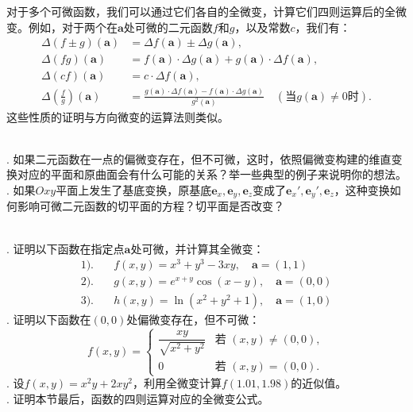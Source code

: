 \documentclass[12pt,UTF8,fontset=none]{ctexbook}
\begin{document}
对于多个可微函数，我们可以通过它们各自的全微变，计算它们四则运算后的全微变。例如，对于两个在$\mathbf{a}$处可微的二元函数$f$和$g$，以及常数$c$，我们有：
\begin{align*}
    \Delta (f\pm g)(\mathbf{a}) &= \Delta f(\mathbf{a}) \pm \Delta g(\mathbf{a}), \\
    \Delta (fg)(\mathbf{a}) &= f(\mathbf{a})\cdot \Delta g(\mathbf{a}) + g(\mathbf{a})\cdot \Delta f(\mathbf{a}), \\
    \Delta(cf)(\mathbf{a}) &= c\cdot \Delta f(\mathbf{a}), \\
    \Delta\left(\frac{f}{g}\right)(\mathbf{a}) &= \frac{g(\mathbf{a})\cdot \Delta f(\mathbf{a}) - f(\mathbf{a})\cdot \Delta g(\mathbf{a})}{g^2(\mathbf{a})} \quad \left(\mbox{当}g(\mathbf{a})\neq 0\mbox{时}\right).
\end{align*}
这些性质的证明与方向微变的运算法则类似。

\begin{sk}
\mbox{}\\
. 如果二元函数在一点的偏微变存在，但不可微，这时，依照偏微变构建的维直变换对应的平面和原曲面会有什么可能的关系？举一些典型的例子来说明你的想法。\\
. 如果$Oxy$平面上发生了基底变换，原基底$\mathbf{e}_x, \mathbf{e}_y, \mathbf{e}_z$变成了$\mathbf{e}_x', \mathbf{e}_y', \mathbf{e}_z$，这种变换如何影响可微二元函数的切平面的方程？切平面是否改变？
\end{sk}

\begin{xt}
    \mbox{}\\
    . 证明以下函数在指定点$\mathbf{a}$处可微，并计算其全微变：
    \begin{align*}
    1).& \quad f(x,y) = x^3 + y^3 - 3xy, \quad \mathbf{a} = (1,1) \\
    2).& \quad g(x,y) = e^{x+y}\cos(x-y), \quad \mathbf{a} = (0,0) \\
    3).& \quad h(x,y) = \ln(x^2+y^2+1), \quad \mathbf{a} = (1,0)
    \end{align*}
    . 证明以下函数在$(0,0)$处偏微变存在，但不可微：
    $$ f(x,y) = \begin{cases}
    \dfrac{xy}{\sqrt{x^2+y^2}} & \text{若 } (x,y)\neq(0,0), \\
    0 & \text{若 } (x,y)=(0,0).
    \end{cases} $$
    . 设$f(x,y) = x^2y + 2xy^2$，利用全微变计算$f(1.01,1.98)$的近似值。\\
    . 证明本节最后，函数的四则运算对应的全微变公式。
\end{xt}
\end{document}
